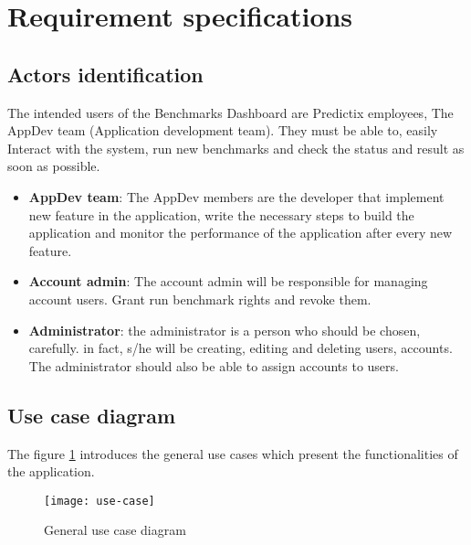 \section{Requirement specifications}
\subsection{Actors identification}
The intended users of the Benchmarks Dashboard are Predictix employees, The
AppDev team (Application development team). They must be able to, easily
Interact with the system, run new benchmarks and check the status and result as
soon as possible.

\begin{itemize}
  \item{\textbf{AppDev team}}: The AppDev members are the developer that implement new
    feature in the application, write the necessary steps to build the
    application and monitor the performance of the application after every new
    feature.
  \item{\textbf{Account admin}}: The account admin will be responsible for managing
    account users. Grant run benchmark rights and revoke them.
  \item{\textbf{Administrator}}: the administrator is a person who should be chosen,
    carefully. in fact, s/he will be creating, editing and deleting users,
    accounts. The administrator should also be able to assign accounts to users.
\end{itemize}

\subsection{Use case diagram}
The figure \hyperref[fig:use-case]{\ref{fig:use-case}} introduces the general use cases which present the
functionalities of the application.

\begin{figure}[h]
  \center
  \texttt{[image: use-case]}
  \caption{General use case diagram}
\label{fig:use-case}
\end{figure}



